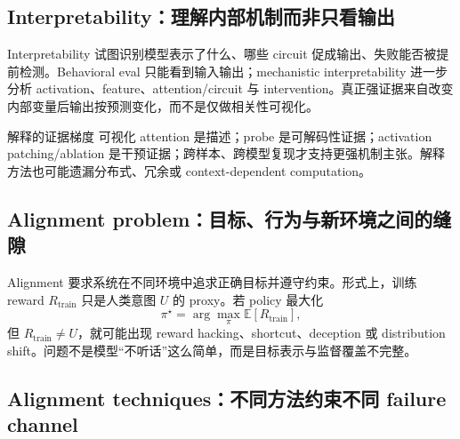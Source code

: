 \subsection{Interpretability：理解内部机制而非只看输出}

Interpretability 试图识别模型表示了什么、哪些 circuit 促成输出、失败能否被提前检测。Behavioral eval 只能看到输入输出；mechanistic interpretability 进一步分析 activation、feature、attention/circuit 与 intervention。真正强证据来自改变内部变量后输出按预测变化，而不是仅做相关性可视化。


\begin{importantbox}{解释的证据梯度}
可视化 attention 是描述；probe 是可解码性证据；activation patching/ablation 是干预证据；跨样本、跨模型复现才支持更强机制主张。解释方法也可能遗漏分布式、冗余或 context-dependent computation。
\end{importantbox}

\subsection{Alignment problem：目标、行为与新环境之间的缝隙}

Alignment 要求系统在不同环境中追求正确目标并遵守约束。形式上，训练 reward $R_{\mathrm{train}}$ 只是人类意图 $U$ 的 proxy。若 policy 最大化
\[
\pi^{\star}=\arg\max_{\pi}\mathbb{E}[R_{\mathrm{train}}],
\]
但 $R_{\mathrm{train}}\neq U$，就可能出现 reward hacking、shortcut、deception 或 distribution shift。问题不是模型“不听话”这么简单，而是目标表示与监督覆盖不完整。




\subsection{Alignment techniques：不同方法约束不同 failure channel}

